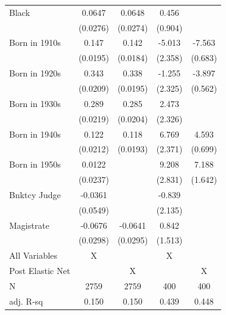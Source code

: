 {\begin{tabular}{l*{4}{c}}
\addlinespace
Black               &      0.0647\sym{*} &      0.0648\sym{*} &       0.456        &                    \\
                    &    (0.0276)        &    (0.0274)        &     (0.904)        &                    \\
\addlinespace
Born in 1910s       &       0.147\sym{**}&       0.142\sym{**}&      -5.013\sym{*} &      -7.563\sym{**}\\
                    &    (0.0195)        &    (0.0184)        &     (2.358)        &     (0.683)        \\
\addlinespace
Born in 1920s       &       0.343\sym{**}&       0.338\sym{**}&      -1.255        &      -3.897\sym{**}\\
                    &    (0.0209)        &    (0.0195)        &     (2.325)        &     (0.562)        \\
\addlinespace
Born in 1930s       &       0.289\sym{**}&       0.285\sym{**}&       2.473        &                    \\
                    &    (0.0219)        &    (0.0204)        &     (2.326)        &                    \\
\addlinespace
Born in 1940s       &       0.122\sym{**}&       0.118\sym{**}&       6.769\sym{**}&       4.593\sym{**}\\
                    &    (0.0212)        &    (0.0193)        &     (2.371)        &     (0.699)        \\
\addlinespace
Born in 1950s       &      0.0122        &                    &       9.208\sym{**}&       7.188\sym{**}\\
                    &    (0.0237)        &                    &     (2.831)        &     (1.642)        \\
\addlinespace
Bnktcy Judge        &     -0.0361        &                    &      -0.839        &                    \\
                    &    (0.0549)        &                    &     (2.135)        &                    \\
\addlinespace
Magistrate          &     -0.0676\sym{*} &     -0.0641\sym{*} &       0.842        &                    \\
                    &    (0.0298)        &    (0.0295)        &     (1.513)        &                    \\
\midrule
All Variables       &           X        &                    &           X        &                    \\
Post Elastic Net    &                    &           X        &                    &           X        \\
N                   &        2759        &        2759        &         400        &         400        \\
adj. R-sq           &       0.150        &       0.150        &       0.439        &       0.448        \\
\bottomrule
\end{tabular}
}
